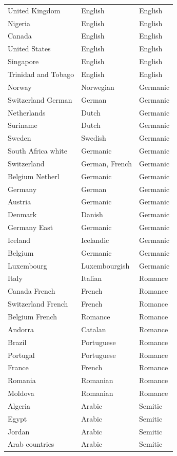 \documentclass[a4paper,10pt]{article}
\begin{document}
\begin{figure}
\begin{longtable}[]{@{}lll@{}}
United Kingdom & English & English \\
Nigeria & English & English \\
Canada & English & English \\
United States & English & English \\
Singapore & English & English \\
Trinidad and Tobago & English & English \\
Norway & Norwegian & Germanic \\
Switzerland German & German & Germanic \\
Netherlands & Dutch & Germanic \\
Suriname & Dutch & Germanic \\
Sweden & Swedish & Germanic \\
South Africa white & Germanic & Germanic \\
Switzerland & German, French & Germanic \\
Belgium Netherl & Germanic & Germanic \\
Germany & German & Germanic \\
Austria & Germanic & Germanic \\
Denmark & Danish & Germanic \\
Germany East & Germanic & Germanic \\
Iceland & Icelandic & Germanic \\
Belgium & Germanic & Germanic \\
Luxembourg & Luxembourgish & Germanic \\
Italy & Italian & Romance \\
Canada French & French & Romance \\
Switzerland French & French & Romance \\
Belgium French & Romance & Romance \\
Andorra & Catalan & Romance \\
Brazil & Portuguese & Romance \\
Portugal & Portuguese & Romance \\
France & French & Romance \\
Romania & Romanian & Romance \\
Moldova & Romanian & Romance \\
Algeria & Arabic & Semitic \\
Egypt & Arabic & Semitic \\
Jordan & Arabic & Semitic \\
Arab countries & Arabic & Semitic \\

\end{longtable}
\end{figure}
\end{document}
